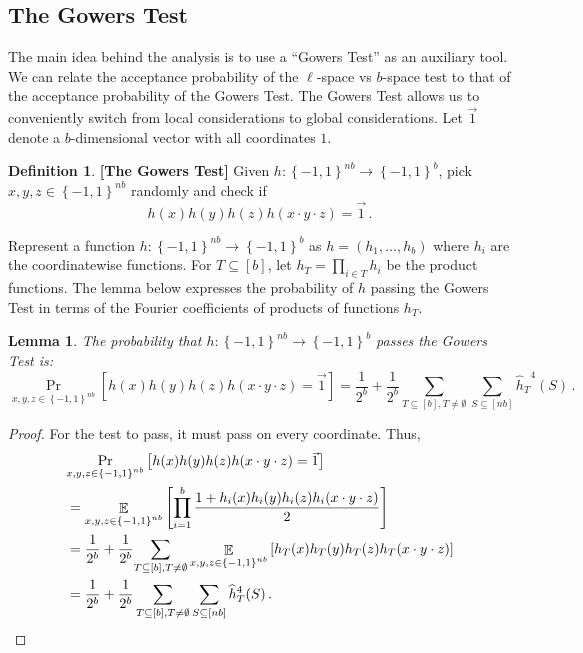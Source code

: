 \documentclass[11pt]{article}
\numberwithin{equation}{section}
\newtheorem{lemma}[theorem]{Lemma}
\theoremstyle{definition}
\newtheorem{definition}[theorem]{Definition}
\theoremstyle{plain}
\newcommand\set[1]{{\left\{ #1 \right\}}}
\newcommand\Prob[2]{{\Pr_{#1}\left[ {#2} \right]}}
\newcommand\Expect[2]{{\mathop{\mathbb{E}}_{#1}\left[ {#2} \right]}}
\newcommand\cube[1]{ { \set{-1,1}^{#1} } }
\begin{document}
%
%
%
%
%
\subsection{The Gowers Test}  %
%
The main idea behind the analysis is to use a %
%
``Gowers Test'' as an auxiliary tool. We can relate the acceptance probability
of the $\ell$-space vs $b$-space test to that of the acceptance probability of
the Gowers Test. The Gowers Test allows us
to conveniently switch from local considerations to global considerations.
Let $\vec{1}$ denote a $b$-dimensional vector with all coordinates $1$.

\begin{definition}{\bf [The Gowers Test]} Given $h: \cube{nb} \to \cube{b}$,
pick $x,y,z\in  \cube{nb}$ randomly and check if
$$h(x)h(y)h(z)h(x\cdot y \cdot z)=\vec{1}\,. $$%
\end{definition}

Represent a function $h: \cube{nb} \to \cube{b}$ as $h = (h_1,\ldots,h_b)$ where $h_i$ are the
coordinatewise functions. For $T \subseteq [b]$, let $h_T = \prod_{i\in T} h_i$ be the product functions.
The lemma below expresses the probability of $h$ passing the Gowers Test
in terms of the Fourier coefficients of products of functions $h_T$.




\begin{lemma}\label{lemma:gowers_to_fourier}
 The probability that  $h\colon \cube{nb} \to \cube{b}$ passes the Gowers Test is:
\[
\Prob{x,y,z\in \cube{nb}}{h(x)h(y)h(z)h(x\cdot y \cdot z)=\vec{1}}=
\frac{1}{2^b} + \frac{1}{2^b} \sum\limits_{T\subseteq [b], T\neq \emptyset}{\sum\limits_{S \subseteq [nb]}{{\widehat{h}_T}^4(S)}}\,.%
\]
\end{lemma}
\begin{proof}
For the test to pass, it must pass on every coordinate. Thus,
%
%
%
%
%
%
%
%
%
%
\begin{align*}
 & \Prob{x,y,z \in \cube{nb}}{h(x)h(y)h(z)h(x\cdot y\cdot z)=\vec{1}} \\
& = \Expect{x,y,z \in \cube{nb}}{  \prod_{i=1}^b  \frac{1+h_i(x)h_i(y)h_i(z)h_i(x\cdot y\cdot z)}{2}}  \\
& = \frac{1}{2^b} + \frac{1}{2^b} {\sum\limits_{T\subseteq [b], T \neq \emptyset}{\Expect{x,y,z\in \cube{nb}}{h_T(x)h_T(y)h_T(z)h_T(x\cdot y\cdot z)}}}  \\
& =  \frac{1}{2^b} + \frac{1}{2^b} \sum\limits_{T\subseteq [b], T \neq \emptyset}{\sum\limits_{S \subseteq [nb]}{{\widehat{h}_T}^4(S)}}
\,.    \qedhere %
\end{align*}
\end{proof}
\end{document}
